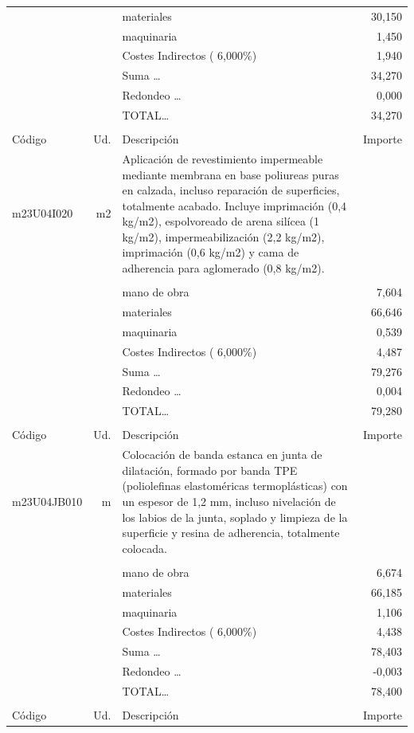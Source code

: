 \documentclass{book}%
\begin{document}
\begin{supertabular}{l r p{60mm} r}
&&materiales&    30,150\\%
&&maquinaria&     1,450\\%
&&Costes Indirectos (     6,000\%)&     1,940\\%
&&Suma \ldots&    34,270\\%
&&Redondeo \ldots&     0,000\\%
%
&&TOTAL\ldots&    34,270\\%
&&&\\%
Código&Ud.&Descripción&Importe\\%
\hline%
m23U04I020&m2&Aplicación de revestimiento impermeable mediante membrana en base poliureas puras en calzada, incluso reparación de superficies, totalmente acabado. Incluye imprimación (0,4 kg/m2), espolvoreado de arena silícea (1 kg/m2), impermeabilización (2,2 kg/m2), imprimación (0,6 kg/m2) y cama de adherencia para aglomerado (0,8 kg/m2).&\\%
&&&\\%
&&mano de obra&     7,604\\%
&&materiales&    66,646\\%
&&maquinaria&     0,539\\%
&&Costes Indirectos (     6,000\%)&     4,487\\%
&&Suma \ldots&    79,276\\%
&&Redondeo \ldots&     0,004\\%
%
&&TOTAL\ldots&    79,280\\%
&&&\\%
Código&Ud.&Descripción&Importe\\%
\hline%
m23U04JB010&m&Colocación de banda estanca en junta de dilatación, formado por banda TPE (poliolefinas elastoméricas termoplásticas) con un espesor de 1,2 mm, incluso nivelación de los labios de la junta, soplado y limpieza de la superficie y resina de adherencia, totalmente colocada.&\\%
&&&\\%
&&mano de obra&     6,674\\%
&&materiales&    66,185\\%
&&maquinaria&     1,106\\%
&&Costes Indirectos (     6,000\%)&     4,438\\%
&&Suma \ldots&    78,403\\%
&&Redondeo \ldots&    {-}0,003\\%
%
&&TOTAL\ldots&    78,400\\%
&&&\\%
Código&Ud.&Descripción&Importe\\%

\end{supertabular}
\end{document}
